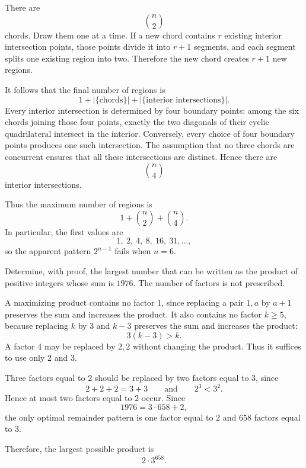     \begin{solution}
        There are
        \[
            \binom{n}{2}
        \]
        chords. Draw them one at a time. If a new chord contains $r$ existing
        interior intersection points, those points divide it into $r+1$
        segments, and each segment splits one existing region into two.
        Therefore the new chord creates $r+1$ new regions.

        It follows that the final number of regions is
        \[
            1
            +
            \left|\{\text{chords}\}\right|
            +
            \left|\{\text{interior intersections}\}\right|.
        \]
        Every interior intersection is determined by four boundary points:
        among the six chords joining those four points, exactly the two
        diagonals of their cyclic quadrilateral intersect in the interior.
        Conversely, every choice of four boundary points produces one such
        intersection. The assumption that no three chords are concurrent
        ensures that all these intersections are distinct. Hence there are
        \[
            \binom{n}{4}
        \]
        interior intersections.

        Thus the maximum number of regions is
        \[
            \boxed{
                1+\binom{n}{2}+\binom{n}{4}
            }.
        \]
        In particular, the first values are
        \[
            1,\ 2,\ 4,\ 8,\ 16,\ 31,\ldots,
        \]
        so the apparent pattern $2^{n-1}$ fails when $n=6$.
    \end{solution}

    \begin{expectedproblem}[1976 IMO]
        Determine, with proof, the largest number that can be written as the
        product of positive integers whose sum is $1976$. The number of
        factors is not prescribed.
    \end{expectedproblem}

    \begin{solution}
        A maximizing product contains no factor $1$, since replacing a pair
        $1,a$ by $a+1$ preserves the sum and increases the product. It also
        contains no factor $k\geq5$, because replacing $k$ by $3$ and $k-3$
        preserves the sum and increases the product:
        \[
            3(k-3)>k.
        \]
        A factor $4$ may be replaced by $2,2$ without changing the product.
        Thus it suffices to use only $2$ and $3$.

        Three factors equal to $2$ should be replaced by two factors equal to
        $3$, since
        \[
            2+2+2=3+3
            \qquad\text{and}\qquad
            2^3<3^2.
        \]
        Hence at most two factors equal to $2$ occur. Since
        \[
            1976=3\cdot658+2,
        \]
        the only optimal remainder pattern is one factor equal to $2$ and
        $658$ factors equal to $3$.

        Therefore, the largest possible product is
        \[
            \boxed{2\cdot3^{658}}.
        \]
    \end{solution}

